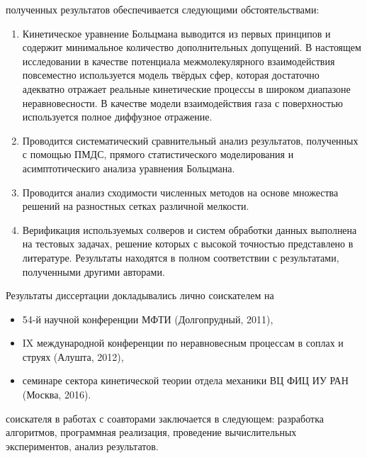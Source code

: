 {\reliability} полученных результатов обеспечивается следующими обстоятельствами:
\begin{enumerate}
    \item Кинетическое уравнение Больцмана выводится из первых принципов и
    содержит минимальное количество дополнительных допущений.
    В настоящем исследовании в качестве потенциала межмолекулярного взаимодействия
    повсеместно используется модель твёрдых сфер,
    которая достаточно адекватно отражает реальные кинетические процессы в широком диапазоне неравновесности.
    В качестве модели взаимодействия газа с поверхностью используется полное диффузное отражение.
    \item Проводится систематический сравнительный анализ результатов,
    полученных с помощью ПМДС, прямого статистического моделирования
    и асимптотическиго анализа уравнения Больцмана.
    \item Проводится анализ сходимости численных методов на основе
    множества решений на разностных сетках различной мелкости.
    \item Верификация используемых солверов и систем обработки данных
    выполнена на тестовых задачах, решение которых с высокой точностью представлено в литературе.
    Результаты находятся в полном соответствии с результатами, полученными другими авторами.
\end{enumerate}

{\probation} Результаты диссертации докладывались лично соискателем на
\begin{itemize}
    \item 54-й научной конференции МФТИ (Долгопрудный, 2011),
    \item IX международной конференции по неравновесным процессам в соплах и струях (Алушта, 2012),
    \item семинаре сектора кинетической теории отдела механики ВЦ ФИЦ ИУ РАН (Москва, 2016).
\end{itemize}

{\contribution} соискателя в работах с соавторами заключается в следующем:
разработка алгоритмов, программная реализация, проведение вычислительных экспериментов, анализ результатов.

